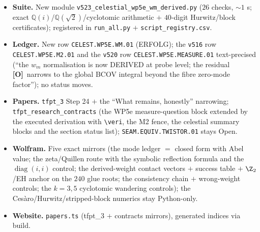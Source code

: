 \documentclass[11pt]{article}
\providecommand{\mO}{\textbf{[O]}}\providecommand{\mX}{\textbf{[X]}}
\providecommand{\vref}[1]{\texttt{#1}}
\providecommand{\Q}{\mathbb{Q}}
\begin{document}
\begin{itemize}[leftmargin=1.5em]
\item \textbf{Suite.} New module \texttt{v523\_celestial\_wp5e\_wm\_derived.py} ($26$ checks,
$\sim1$ s; exact $\Q(i)$/$\Q(\sqrt2)$/cyclotomic arithmetic $+$ $40$-digit Hurwitz/block
certificates); registered in \texttt{run\_all.py} $+$ \texttt{script\_registry.csv}.
\item \textbf{Ledger.} New row \texttt{CELEST.WP5E.WM.01} (ERFOLG); the \vref{v516} row
\texttt{CELEST.WP5E.M2.01} and the \vref{v520} row \texttt{CELEST.WP5E.MEASURE.01}
text-precised (``the $w_m$ normalisation is now DERIVED at probe level; the residual \mO\
narrows to the global BCOV integral beyond the fibre zero-mode factor''); no status moves.
\item \textbf{Papers.} \texttt{tfpt\_3} Step 24 $+$ the ``What remains, honestly'' narrowing;
\texttt{tfpt\_research\_contracts} (the WP5e measure-question block extended by the executed
derivation with \texttt{\textbackslash veri}, the M2 fence, the celestial summary blocks and
the section status list); \texttt{SEAM.EQUIV.TWISTOR.01} stays Open.
\item \textbf{Wolfram.} Five exact mirrors (the mode ledger $=$ closed form with Abel value;
the zeta/Quillen route with the symbolic reflection formula and the $\operatorname{diag}(i,i)$
control; the derived-weight contact vectors $+$ success table $+$ $\Z_2$/EH anchor on the
$240$ glue roots; the consistency chain $+$ wrong-weight controls; the $k=3,5$ cyclotomic
wandering controls); the Ces\`aro/Hurwitz/stripped-block numerics stay Python-only.
\item \textbf{Website.} \texttt{papers.ts} (tfpt\_3 $+$ contracts mirrors), generated indices
via build.
\end{itemize}
\end{document}
